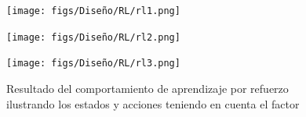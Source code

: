 \begin{figure}[H]
  \centering
  \begin{minipage}{0.3\textwidth}
    \texttt{[image: figs/Diseño/RL/rl1.png]}
  \end{minipage}
  \hfill
  \begin{minipage}{0.3\textwidth}
    \texttt{[image: figs/Diseño/RL/rl2.png]}
  \end{minipage}
  \hfill
  \begin{minipage}{0.3\textwidth}
    \texttt{[image: figs/Diseño/RL/rl3.png]}
  \end{minipage}
  \caption{Resultado del comportamiento de aprendizaje por refuerzo ilustrando los estados y acciones teniendo en cuenta el factor}
  \label{fig:comparativa}
\end{figure}














        


  

